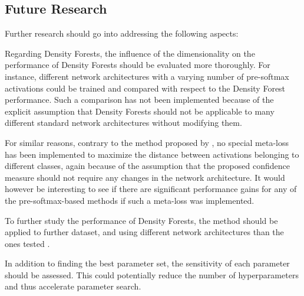 \documentclass[10pt]{article}
\begin{document}
\subsection{Future Research}
Further research should go into addressing the following aspects:

Regarding Density Forests, the influence of the dimensionality on the performance of Density Forests should be evaluated more thoroughly. For instance, different network architectures with a varying number of pre-softmax activations could be trained and compared with respect to the Density Forest performance. Such a comparison has not been implemented because of the explicit assumption that Density Forests should not be applicable to many different standard network architectures without modifying them.

For similar reasons, contrary to the method proposed by  \textcite{mandelbaum17}, no special meta-loss has been implemented to maximize the distance between activations belonging to different classes, again because of the assumption that the proposed confidence measure should not require any changes in the network architecture. It would however be interesting to see if there are significant performance gains for any of the pre-softmax-based methods if such a meta-loss was implemented. 

To further study the performance of Density Forests, the method should be applied to further dataset, and using different network architectures than the ones tested \cite{ronneberger2015u,Berkeley2015HypercolumnsFO}.

In addition to finding the best parameter set, the sensitivity of each parameter should be assessed. This could potentially reduce the number of hyperparameters and thus accelerate parameter search.
\end{document}
